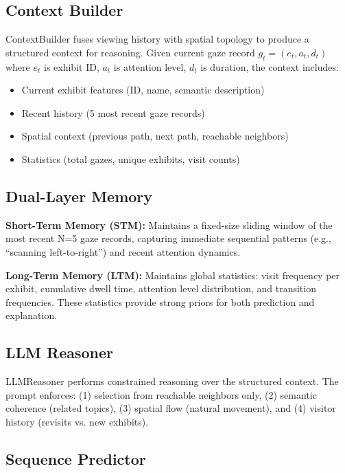\documentclass{letterpaper,article}
\begin{document}
\subsection{Context Builder}

ContextBuilder fuses viewing history with spatial topology to produce a structured context for reasoning. Given current gaze record $g_t = (e_t, a_t, d_t)$ where $e_t$ is exhibit ID, $a_t$ is attention level, $d_t$ is duration, the context includes:
\begin{itemize}
    \item Current exhibit features (ID, name, semantic description)
    \item Recent history (5 most recent gaze records)
    \item Spatial context (previous path, next path, reachable neighbors)
    \item Statistics (total gazes, unique exhibits, visit counts)
\end{itemize}

\subsection{Dual-Layer Memory}

\textbf{Short-Term Memory (STM):} Maintains a fixed-size sliding window of the most recent N=5 gaze records, capturing immediate sequential patterns (e.g., ``scanning left-to-right'') and recent attention dynamics.

\textbf{Long-Term Memory (LTM):} Maintains global statistics: visit frequency per exhibit, cumulative dwell time, attention level distribution, and transition frequencies. These statistics provide strong priors for both prediction and explanation.

\subsection{LLM Reasoner}

LLMReasoner performs constrained reasoning over the structured context. The prompt enforces: (1) selection from reachable neighbors only, (2) semantic coherence (related topics), (3) spatial flow (natural movement), and (4) visitor history (revisits vs. new exhibits).

\subsection{Sequence Predictor}
\end{document}

